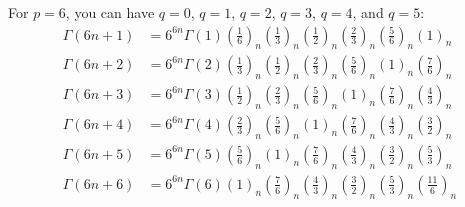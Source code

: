 For $p = 6$, you can have $q = 0$, $q = 1$, $q = 2$, $q = 3$, $q = 4$, and $q = 5$:
\begin{align}
	\Gamma(6n+1) & = 6^{6n} \Gamma(1) \left(\frac{1}{6}\right)_{n} \left(\frac{1}{3}\right)_{n} \left(\frac{1}{2}\right)_{n} \left(\frac{2}{3}\right)_{n} \left(\frac{5}{6}\right)_{n} \left(1\right)_{n} \\
	\Gamma(6n+2) & = 6^{6n} \Gamma(2) \left(\frac{1}{3}\right)_{n} \left(\frac{1}{2}\right)_{n} \left(\frac{2}{3}\right)_{n} \left(\frac{5}{6}\right)_{n} \left(1\right)_{n} \left(\frac{7}{6}\right)_{n} \\
	\Gamma(6n+3) & = 6^{6n} \Gamma(3) \left(\frac{1}{2}\right)_{n} \left(\frac{2}{3}\right)_{n} \left(\frac{5}{6}\right)_{n} \left(1\right)_{n} \left(\frac{7}{6}\right)_{n} \left(\frac{4}{3}\right)_{n} \\
    \Gamma(6n+4) & = 6^{6n} \Gamma(4) \left(\frac{2}{3}\right)_{n} \left(\frac{5}{6}\right)_{n} \left(1\right)_{n} \left(\frac{7}{6}\right)_{n} \left(\frac{4}{3}\right)_{n} \left(\frac{3}{2}\right)_{n} \\
    \Gamma(6n+5) & = 6^{6n} \Gamma(5) \left(\frac{5}{6}\right)_{n} \left(1\right)_{n} \left(\frac{7}{6}\right)_{n} \left(\frac{4}{3}\right)_{n} \left(\frac{3}{2}\right)_{n} \left(\frac{5}{3}\right)_{n} \\
    \Gamma(6n+6) & = 6^{6n} \Gamma(6) \left(1\right)_{n} \left(\frac{7}{6}\right)_{n} \left(\frac{4}{3}\right)_{n} \left(\frac{3}{2}\right)_{n} \left(\frac{5}{3}\right)_{n} \left(\frac{11}{6}\right)_{n}
\end{align}
